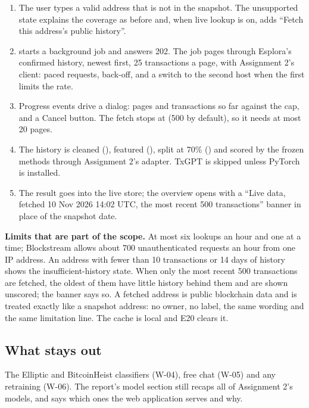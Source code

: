\begin{enumerate}
  \item The user types a valid address that is not in the snapshot. The unsupported state explains
    the coverage as before and, when live lookup is on, adds ``Fetch this address's public history''.
  \item {} starts a background job and answers 202. The job pages
    through Esplora's confirmed history, newest first, 25 transactions a page, with Assignment 2's
    client: paced requests, back-off, and a switch to the second host when the first limits the rate.
  \item Progress events drive a dialog: pages and transactions so far against the cap, and a
    Cancel button. The fetch stops at  (500 by default), so it needs at most 20 pages.
  \item The history is cleaned (), featured (),
    split at 70\% () and scored by the frozen methods through Assignment 2's
    adapter. TxGPT is skipped unless PyTorch is installed.
  \item The result goes into the live store; the overview opens with a ``Live data, fetched
    10 Nov 2026 14:02 UTC, the most recent 500 transactions'' banner in place of the snapshot date.
\end{enumerate}

\begin{caution}
\textbf{Limits that are part of the scope.} At most six lookups an hour and one at a time;
Blockstream allows about 700 unauthenticated requests an hour from one IP address. An address with fewer than 10
transactions or 14 days of history shows the insufficient-history state. When only the most recent
500 transactions are fetched, the oldest of them have little history behind them and are shown
unscored; the banner says so. A fetched address is public blockchain data and is treated exactly
like a snapshot address: no owner, no label, the same wording and the same limitation line. The
cache is local and E20 clears it.
\end{caution}

\subsection{What stays out}

The Elliptic and BitcoinHeist classifiers (W-04), free chat (W-05) and any retraining (W-06). The
report's model section still recaps all of Assignment 2's models, and says which ones the web
application serves and why.
